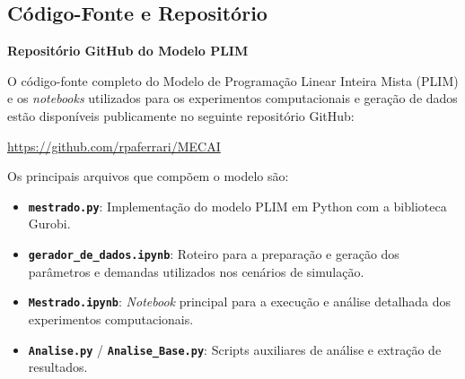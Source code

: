 \documentclass [mestrado, pre-defesa]{packages/icmc}
\begin{document}
\postextual





\begin{apendicesenv}

    \chapter{Código-Fonte e Repositório}
    \label{anexo:codigo}

    \begin{center}
        \textbf{Repositório GitHub do Modelo PLIM}
    \end{center}

    \noindent O código-fonte completo do Modelo de Programação Linear Inteira Mista (PLIM) e os \textit{notebooks} utilizados para os experimentos computacionais e geração de dados estão disponíveis publicamente no seguinte repositório GitHub:

    \begin{center}
        \url{https://github.com/rpaferrari/MECAI}
    \end{center}

    \noindent Os principais arquivos que compõem o modelo são:
    \begin{itemize}
        \item \textbf{\texttt{mestrado.py}}: Implementação do modelo PLIM em Python com a biblioteca Gurobi.
        \item \textbf{\texttt{gerador\_de\_dados.ipynb}}: Roteiro para a preparação e geração dos parâmetros e demandas utilizados nos cenários de simulação.
        \item \textbf{\texttt{Mestrado.ipynb}}: \textit{Notebook} principal para a execução e análise detalhada dos experimentos computacionais.
        \item \textbf{\texttt{Analise.py}} / \textbf{\texttt{Analise\_Base.py}}: Scripts auxiliares de análise e extração de resultados.
    \end{itemize}

\end{apendicesenv}
\end{document}
